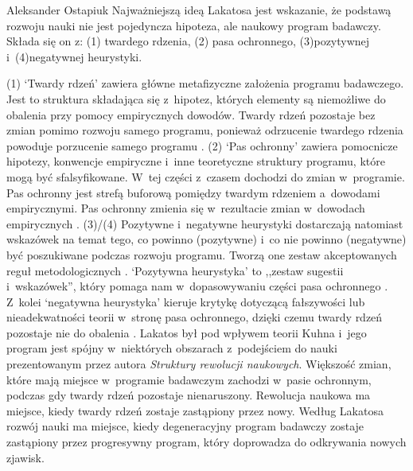 \begin{artplenv}{Aleksander Ostapiuk}
Najważniejszą ideą Lakatosa jest wskazanie, że podstawą rozwoju nauki nie jest pojedyncza hipoteza, ale naukowy program
badawczy. Składa się on z: (1) twardego rdzenia, (2) pasa ochronnego, (3)pozytywnej i~(4)negatywnej heurystyki. 

(1) `Twardy rdzeń' zawiera główne metafizyczne założenia programu badawczego. Jest to struktura składająca
się z~hipotez, których elementy są niemożliwe do obalenia przy pomocy empirycznych dowodów. Twardy rdzeń pozostaje bez zmian
pomimo rozwoju samego programu, ponieważ odrzucenie twardego rdzenia powoduje porzucenie samego programu
\parencite[s.~122]{hands_reflection_2001}.
(2) `Pas ochronny' zawiera pomocnicze hipotezy, konwencje
empiryczne i~inne teoretyczne struktury programu, które mogą być sfalsyfikowane. W~tej części z~czasem dochodzi do
zmian w~programie. Pas ochronny jest strefą buforową pomiędzy twardym rdzeniem a~dowodami empirycznymi. Pas ochronny zmienia
się w~rezultacie zmian w~dowodach empirycznych
\parencite[s.~122]{hands_reflection_2001}.
(3)/(4)
Pozytywne i~negatywne heurystyki dostarczają natomiast wskazówek na temat tego, co powinno (pozytywne) i~co nie powinno (negatywne)
być poszukiwane podczas rozwoju programu. Tworzą one zestaw akceptowanych reguł metodologicznych
\parencite[s.~47]{lakatos_falsification_1970}.
`Pozytywna heurystyka' to ,,zestaw sugestii i~wskazówek'', który pomaga
nam w~dopasowywaniu części pasa ochronnego
\parencite[s.~50]{lakatos_falsification_1970}.
Z~kolei `negatywna
heurystyka' kieruje krytykę dotyczącą fałszywości lub nieadekwatności teorii w~stronę pasa ochronnego, dzięki czemu
twardy rdzeń pozostaje nie do obalenia
\parencite[s.~48–50]{lakatos_falsification_1970}.
Lakatos był pod wpływem
teorii Kuhna
\parencite*{kuhn_structure_1962}
i~jego program jest spójny w~niektórych obszarach z~podejściem do nauki
prezentowanym przez autora \textit{Struktury rewolucji naukowych}. Większość zmian, które mają miejsce w~programie
badawczym zachodzi w~pasie ochronnym, podczas gdy twardy rdzeń pozostaje nienaruszony. Rewolucja naukowa ma miejsce,
kiedy twardy rdzeń zostaje zastąpiony przez nowy. Według Lakatosa rozwój nauki ma miejsce, kiedy degeneracyjny program
badawczy zostaje zastąpiony przez progresywny program, który doprowadza do odkrywania nowych zjawisk.


\end{artplenv}
